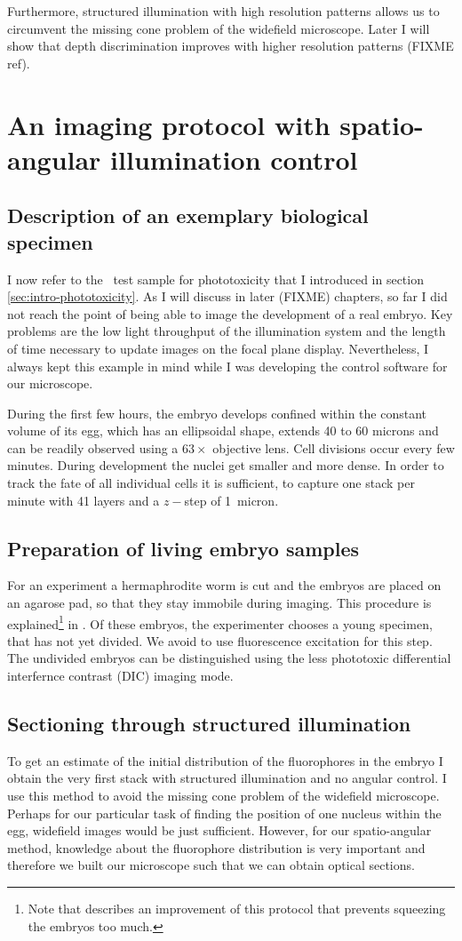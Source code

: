 Furthermore, structured illumination with high resolution patterns
allows us to circumvent the missing cone problem of the widefield
microscope.  Later I will show that depth discrimination improves with
higher resolution patterns (FIXME ref).
\section{An imaging protocol with spatio-angular illumination control}
\subsection{Description of an exemplary biological specimen} 
I now refer to the \celegans\ test sample for phototoxicity that I
introduced in section \ref{sec:intro-phototoxicity}. As I will discuss
in later (FIXME) chapters, so far I did not reach the point of being
able to image the development of a real embryo. Key problems are the
low light throughput of the illumination system and the length of time
necessary to update images on the focal plane display. Nevertheless, I
always kept this example in mind while I was developing the control
software for our microscope.

During the first few hours, the embryo develops confined within the
constant volume of its egg, which has an ellipsoidal shape, extends 40
to 60 microns and can be readily observed using a $63\times$ objective
lens. Cell divisions occur every few minutes.  During development the
nuclei get smaller and more dense. In order to track the fate of all
individual cells it is sufficient, to capture one stack per minute
with 41 layers and a $z-$step of 1~micron.
\subsection{Preparation of living embryo samples} 
For an experiment a hermaphrodite worm is cut and the embryos are
placed on an agarose pad, so that they stay immobile during
imaging. This procedure is explained\footnote{Note that
  \cite{Murray2006} describes an improvement of this protocol that
  prevents squeezing the embryos too much.} in \cite{Hope1999}. Of
these embryos, the experimenter chooses a young specimen, that has not
yet divided. We avoid to use fluorescence excitation for this step.
The undivided embryos can be distinguished using the less phototoxic
differential interfernce contrast (DIC) imaging mode.

\subsection{Sectioning through structured illumination} 
To get an estimate of the initial distribution of the fluorophores in
the embryo I obtain the very first stack with structured illumination
and no angular control. I use this method to avoid the missing cone
problem of the widefield microscope. Perhaps for our particular task
of finding the position of one nucleus within the egg, widefield
images would be just sufficient.  However, for our spatio-angular
method, knowledge about the fluorophore distribution is very important
and therefore we built our microscope such that we can obtain optical
sections.

